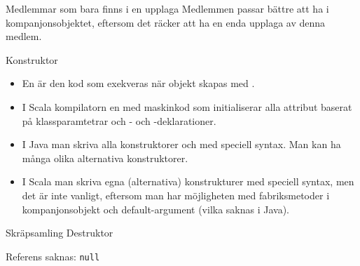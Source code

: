 \begin{Slide}{Medlemmar som bara finns i en upplaga}
Medlemmen  passar bättre att ha i kompanjonsobjektet, eftersom det räcker att ha en enda upplaga av denna medlem.  
\end{Slide}

\begin{Slide}{Konstruktor}
\begin{itemize}
\item En  är den kod som exekveras när objekt skapas med . 

\item I Scala  kompilatorn en  med maskinkod som initialiserar alla attribut baserat på klassparamtetrar och - och -deklarationer. 

\item I Java  man  skriva alla konstruktorer och med speciell syntax. Man kan ha många olika alternativa konstruktorer.

\item I Scala  man skriva egna (alternativa) konstrukturer med speciell syntax, men det är inte vanligt, eftersom man har möjligheten med fabriksmetoder i kompanjonsobjekt och default-argument (vilka saknas i Java). 
\end{itemize}
\end{Slide}

\begin{Slide}{Skräpsamling}
Destruktor
\end{Slide}



\begin{Slide}{Referens saknas: \texttt{null}}
\end{Slide}




